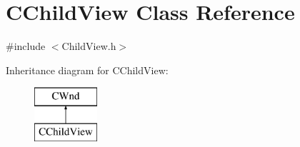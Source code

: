 \hypertarget{class_c_child_view}{}\section{C\+Child\+View Class Reference}
\label{class_c_child_view}


{\ttfamily \#include $<$Child\+View.\+h$>$}

Inheritance diagram for C\+Child\+View\+:\begin{figure}[H]
\begin{center}
\leavevmode
\includegraphics[height=2.000000cm]{class_c_child_view}
\end{center}
\end{figure}
